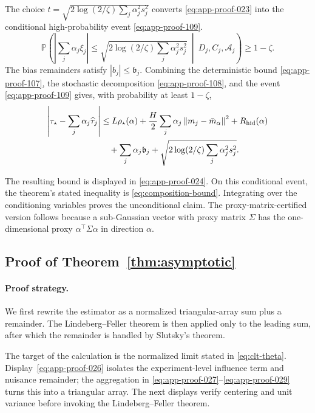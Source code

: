 \documentclass[11pt]{article}
\numberwithin{equation}{section}
\newcommand{\Pbb}{\mathbb P}
\newcommand{\1}{\mathbf 1}
\newcommand{\cA}{\mathcal A}
\newcommand{\norm}[1]{\left\lVert #1\right\rVert}
\newcommand{\abs}[1]{\left\lvert #1\right\rvert}
\begin{document}
The choice \(t=\sqrt{2\log(2/\zeta)\sum_j\alpha_j^2s_j^2}\) converts
\eqref{eq:app-proof-023} into the conditional high-probability event
\eqref{eq:app-proof-109}.
\begin{equation}
\label{eq:app-proof-109}
  \Pbb\left(
  \abs{\sum_j\alpha_j\xi_j}
  \leq
  \sqrt{2\log(2/\zeta)\sum_j\alpha_j^2s_j^2}
  \ \middle|\ D_j,C_j,\cA_j
  \right)
  \geq 1-\zeta.
\end{equation}
The bias remainders satisfy \(\abs{b_j}\le\mathfrak b_j\).  Combining the
deterministic bound \eqref{eq:app-proof-107}, the stochastic decomposition
\eqref{eq:app-proof-108}, and the event \eqref{eq:app-proof-109} gives, with
probability at least \(1-\zeta\),
\begin{equation}
\label{eq:app-proof-024}
\begin{aligned}
\abs{\tau_\star-\sum_j\alpha_j\widehat\tau_j}
&\le L\rho_\star(\alpha)
+\frac{H}{2}\sum_j\alpha_j\norm{m_j-\bar m_\alpha}^2
+R_{\rm hid}(\alpha)\\
&\quad+\sum_j\alpha_j\mathfrak b_j
+\sqrt{2\log(2/\zeta)\sum_j\alpha_j^2s_j^2}.
\end{aligned}
\end{equation}

The resulting bound is displayed in \eqref{eq:app-proof-024}.  On this conditional event, the theorem's stated inequality is \eqref{eq:composition-bound}.  Integrating over the
conditioning variables proves the unconditional claim.  The proxy-matrix-certified version follows because a sub-Gaussian vector with
proxy matrix \(\Sigma\) has the one-dimensional proxy
\(\alpha^\top\Sigma\alpha\) in direction \(\alpha\).



\subsection{Proof of Theorem~\ref{thm:asymptotic}}
\label{app:proof-thm-asymptotic}

\paragraph{Proof strategy.} We first rewrite the estimator as a normalized triangular-array sum plus a remainder.  The Lindeberg--Feller theorem is then applied only to the leading sum, after which the remainder is handled by Slutsky's theorem.

The target of the calculation is the normalized limit stated in
\eqref{eq:clt-theta}.  Display~\eqref{eq:app-proof-026} isolates the
experiment-level influence term and nuisance remainder; the aggregation in
\eqref{eq:app-proof-027}--\eqref{eq:app-proof-029} turns this into a triangular
array.  The next displays verify centering and unit variance before invoking
the Lindeberg--Feller theorem.
\end{document}
